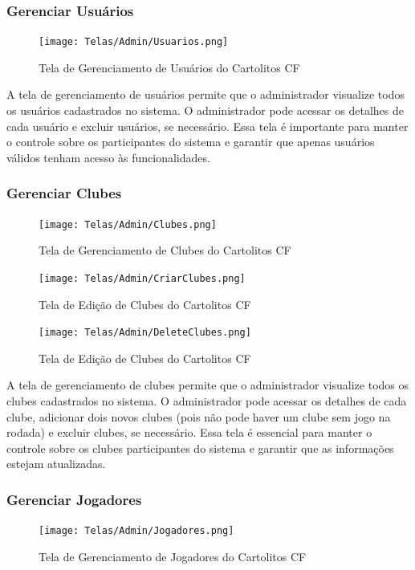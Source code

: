 \documentclass[12pt]{article}
\begin{document}
\subsubsection{Gerenciar Usuários}
\label{sec:gerenciar_usuarios}
\begin{figure}[H]
  \centering
  \texttt{[image: Telas/Admin/Usuarios.png]}
  \caption{Tela de Gerenciamento de Usuários do Cartolitos CF}
  \label{fig:gerenciar_usuarios}
\end{figure}
A tela de gerenciamento de usuários permite que o administrador visualize todos os usuários cadastrados no sistema. O administrador pode acessar os detalhes de cada usuário e excluir usuários, se necessário. Essa tela é importante para manter o controle sobre os participantes do sistema e garantir que apenas usuários válidos tenham acesso às funcionalidades.

\subsubsection{Gerenciar Clubes}
\label{sec:gerenciar_clubes}
\begin{figure}[H]
  \centering
  \texttt{[image: Telas/Admin/Clubes.png]}
  \caption{Tela de Gerenciamento de Clubes do Cartolitos CF}
  \label{fig:gerenciar_clubes}
\end{figure}

\begin{figure}[H]
  \centering
  \texttt{[image: Telas/Admin/CriarClubes.png]}
  \caption{Tela de Edição de Clubes do Cartolitos CF}
  \label{fig:editar_clube}
\end{figure}

\begin{figure}[H]
  \centering
  \texttt{[image: Telas/Admin/DeleteClubes.png]}
  \caption{Tela de Edição de Clubes do Cartolitos CF}
  \label{fig:editar_clube2}
\end{figure}
A tela de gerenciamento de clubes permite que o administrador visualize todos os clubes cadastrados no sistema. O administrador pode acessar os detalhes de cada clube, adicionar dois novos clubes (pois não pode haver um clube sem jogo na rodada) e excluir clubes, se necessário. Essa tela é essencial para manter o controle sobre os clubes participantes do sistema e garantir que as informações estejam atualizadas.

\subsubsection{Gerenciar Jogadores}
\label{sec:gerenciar_jogadores}
\begin{figure}[H]
  \centering
  \texttt{[image: Telas/Admin/Jogadores.png]}
  \caption{Tela de Gerenciamento de Jogadores do Cartolitos CF}
  \label{fig:gerenciar_jogadores}
\end{figure}
\end{document}
